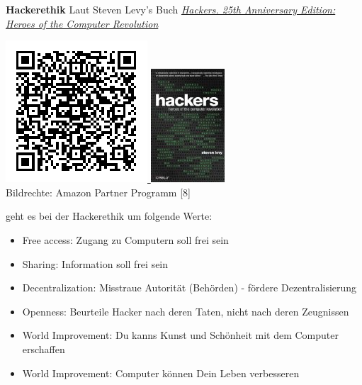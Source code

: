 \textbf{Hackerethik} Laut Steven Levy's Buch \href{http://www.amazon.de/gp/product/1449388396/ref=as_li_ss_tl?ie=UTF8&camp=1638&creative=19454&creativeASIN=1449388396&linkCode=as2&tag=spielendprogr-21}{\textit{Hackers. 25th Anniversary Edition: Heroes of the Computer Revolution}}\\ 
\begin{center}
\href{http://www.amazon.de/gp/product/1449388396/ref=as_li_ss_tl?ie=UTF8&camp=1638&creative=19454&creativeASIN=1449388396&linkCode=as2&tag=spielendprogr-21}{
\includegraphics[width=0.4\linewidth]{editoral/editoral-hackersqrcode.png} 
\includegraphics[width=0.4\linewidth]{editoral/editoral-hackers.jpg}}\\
\footnotesize{Bildrechte: Amazon Partner Programm [8]}
\end{center}
geht es bei der Hackerethik um folgende Werte:
\begin{itemize}
\item Free access: Zugang zu Computern soll frei sein
\item Sharing: Information soll frei sein
\item Decentralization: Misstraue Autorität (Behörden) - fördere Dezentralisierung
\item Openness: Beurteile Hacker nach deren Taten, nicht nach deren Zeugnissen
\item World Improvement: Du kanns Kunst und Schönheit mit dem Computer erschaffen
\item World Improvement: Computer können Dein Leben verbesseren
\end{itemize}

